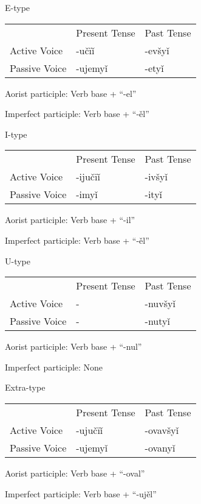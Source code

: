 E-type

\begin{table}
	\begin{tabular}{lll}
		& Present Tense & Past Tense \\
		Active Voice & -učïǐ & -evšyǐ \\
		Passive Voice & -ujemyǐ & -etyǐ
	\end{tabular}
\end{table}

Aorist participle: Verb base + “-el”

Imperfect participle: Verb base + “-ěl”

I-type

\begin{table}
	\begin{tabular}{lll}
		& Present Tense & Past Tense \\
		Active Voice & -ijučïǐ & -ivšyǐ \\
		Passive Voice & -imyǐ & -ityǐ
	\end{tabular}
\end{table}

Aorist participle: Verb base + “-il”

Imperfect participle: Verb base + “-ěl”

U-type

\begin{table}
	\begin{tabular}{lll}
		& Present Tense & Past Tense \\
		Active Voice & - & -nuvšyǐ \\
		Passive Voice & - & -nutyǐ
	\end{tabular}
\end{table}

Aorist participle: Verb base + “-nul”

Imperfect participle: None

Extra-type 

\begin{table}
	\begin{tabular}{lll}
		& Present Tense & Past Tense \\
		Active Voice & -ujučïǐ & -ovavšyǐ \\
		Passive Voice & -ujemyǐ & -ovanyǐ
	\end{tabular}
\end{table}

Aorist participle: Verb base + “-oval”

Imperfect participle: Verb base + “-ujěl”
